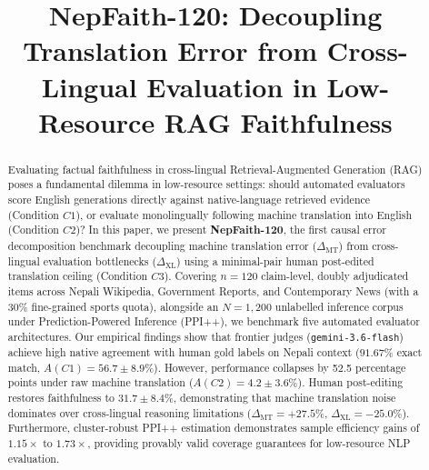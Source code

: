 \documentclass[conference]{IEEEtran}
\begin{document}
\title{NepFaith-120: Decoupling Translation Error from Cross-Lingual Evaluation in Low-Resource RAG Faithfulness}

\author{
\and
{}
}

\maketitle

\begin{abstract}
Evaluating factual faithfulness in cross-lingual Retrieval-Augmented Generation (RAG) poses a fundamental dilemma in low-resource settings: should automated evaluators score English generations directly against native-language retrieved evidence (Condition $C1$), or evaluate monolingually following machine translation into English (Condition $C2$)? 
In this paper, we present \textbf{NepFaith-120}, the first causal error decomposition benchmark decoupling machine translation error ($\Delta_{\text{MT}}$) from cross-lingual evaluation bottlenecks ($\Delta_{\text{XL}}$) using a minimal-pair human post-edited translation ceiling (Condition $C3$). 
Covering $n=120$ claim-level, doubly adjudicated items across Nepali Wikipedia, Government Reports, and Contemporary News (with a 30\% fine-grained sports quota), alongside an $N=1,200$ unlabelled inference corpus under Prediction-Powered Inference (PPI++), we benchmark five automated evaluator architectures. 
Our empirical findings show that frontier judges (\texttt{gemini-3.6-flash}) achieve high native agreement with human gold labels on Nepali context ($91.67\%$ exact match, $A(C1) = 56.7 \pm 8.9\%$). However, performance collapses by 52.5 percentage points under raw machine translation ($A(C2) = 4.2 \pm 3.6\%$). Human post-editing restores faithfulness to $31.7 \pm 8.4\%$, demonstrating that machine translation noise dominates over cross-lingual reasoning limitations ($\Delta_{\text{MT}} = +27.5\%$, $\Delta_{\text{XL}} = -25.0\%$). 
Furthermore, cluster-robust PPI++ estimation demonstrates sample efficiency gains of $1.15\times$ to $1.73\times$, providing provably valid coverage guarantees for low-resource NLP evaluation.
\end{abstract}
\end{document}
